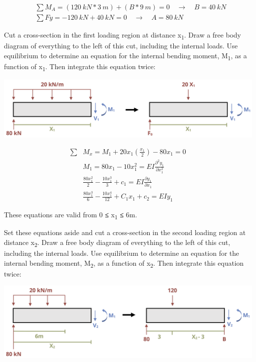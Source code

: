 \documentclass[
  letterpaper,
  DIV=11,
  numbers=noendperiod]{scrreprt}
\begin{document}
\begin{tcolorbox}
\begin{tcolorbox}
\[
\begin{aligned}
& \sum M_A=(120{~kN}*3{~m})+(B*9{~m})=0 \quad \rightarrow \quad B=40{~kN} \\
& \sum F y=-120{~kN}+40{~kN}=0 \quad \rightarrow \quad A=80{~kN}
\end{aligned}
\]

Cut a cross-section in the first loading region at distance
x\textsubscript{1}. Draw a free body diagram of everything to the left
of this cut, including the internal loads. Use equilibrium to determine
an equation for the internal bending moment, M\textsubscript{1}, as a
function of x\textsubscript{1}. Then integrate this equation twice:

\begin{center}
\includegraphics{images/CH11 PNGs/example11.3-3.png}
\end{center}

\[
\begin{aligned}
\sum &M_x=M_1+20 x_1\left(\frac{x_1}{2}\right)-80 x_1=0 \\
&M_1=80 x_1-10 x_1^2=E I \frac{\partial^2 y_1}{\partial x_1^2} \\ 
&\frac{80 x_1^2}{2}-\frac{10 x_1^3}{3}+c_1=E I \frac{\partial y_1}{\partial x_1} \\
&\frac{80 x_1^3}{6}-\frac{10 x_1^4}{12}+C_1 x_1+c_2=E I y_1
\end{aligned}
\]

These equations are valid from 0 \textbf{≤} x\textsubscript{1}
\textbf{≤} 6m.

Set these equations aside and cut a cross-section in the second loading
region at distance x\textsubscript{2}. Draw a free body diagram of
everything to the left of this cut, including the internal loads. Use
equilibrium to determine an equation for the internal bending moment,
M\textsubscript{2}, as a function of x\textsubscript{2}. Then integrate
this equation twice:

\begin{center}
\includegraphics{images/CH11 PNGs/example11.3-4.png}
\end{center}


\end{tcolorbox}
\end{tcolorbox}
\end{document}
